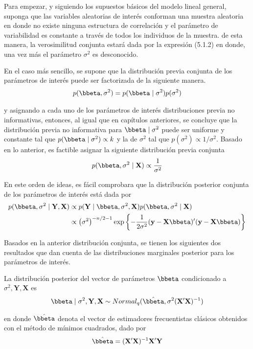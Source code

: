 Para empezar, y siguiendo los supuestos básicos del modelo lineal general, suponga que las variables aleatorias de interés conforman una muestra aleatoria en donde no existe ninguna estructura de correlación y el parámetro de variabilidad es constante a través de todos los individuos de la muestra. de esta manera, la verosimilitud conjunta estará dada por la expresión (5.1.2) en donde, una vez más el parámetro $\sigma^2$ es desconocido.

En el caso más sencillo, se supone que la distribución previa conjunta de los parámetros de interés puede ser factorizada de la siguiente manera.
\begin{equation*}
p(\bbeta,\sigma^2)=p(\bbeta \mid \sigma^2)p(\sigma^2)
\end{equation*}

y asignando a cada uno de los parámetros de interés distribuciones previa no informativas, entonces, al igual que en capítulos anteriores, se concluye que la distribución previa no informativa para $\bbeta \mid \sigma^2$ puede ser uniforme y constante tal que $p(\bbeta \mid \sigma^2)\propto k$ y la de $\sigma^2$ tal que $p(\sigma^2)\propto 1/\sigma^2$. Basado en lo anterior, es factible asignar la siguiente distribución previa conjunta
\begin{equation*}
p(\bbeta,\sigma^2 \mid \mathbf{X})\propto\frac{1}{\sigma^2}
\end{equation*}

En este orden de ideas, es fácil comprobara que la distribución posterior conjunta de los parámetros de interés está dada por
\begin{align}
p(\bbeta,\sigma^2 \mid \mathbf{Y},\mathbf{X})&\propto
p(\mathbf{Y} \mid \bbeta,\sigma^2,\mathbf{X})p(\bbeta,\sigma^2 \mid \mathbf{X}) \notag \\
&\propto\left(\sigma^2\right)^{-n/2-1}
\exp\left\{-\frac{1}{2\sigma^2}(\mathbf{y}-\mathbf{X}\bbeta)'(\mathbf{y}-\mathbf{X}\bbeta)\right\}
\end{align}

Basados en la anterior distribución conjunta, se tienen los siguientes dos resultados que dan cuenta de las distribuciones marginales posterior para los parámetros de interés.

\begin{Res}
La distribución posterior del vector de parámetros $\bbeta$ condicionado a $\sigma^2, \mathbf{Y}, \mathbf{X}$ es
\begin{equation*}
\bbeta \mid \sigma^2, \mathbf{Y}, \mathbf{X}\sim Normal_q(\hat{\bbeta}, \sigma^2(\mathbf{X}'\mathbf{X})^{-1})
\end{equation*}

en donde $\hat{\bbeta}$ denota el vector de estimadores frecuentistas clásicos obtenidos con el método de mínimos cuadrados, dado por
\begin{equation}
\hat{\bbeta}=(\mathbf{X}'\mathbf{X})^{-1}\mathbf{X}'\mathbf{Y}
\end{equation}
\end{Res}

